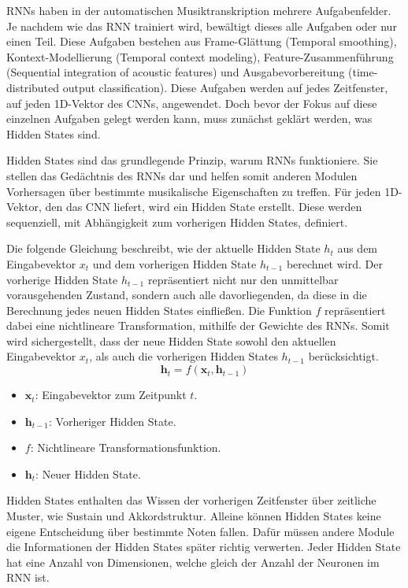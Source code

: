 RNNs haben in der automatischen Musiktranskription mehrere Aufgabenfelder.
Je nachdem wie das RNN trainiert wird, bewältigt dieses alle Aufgaben oder nur einen Teil.
Diese Aufgaben bestehen aus Frame-Glättung (Temporal smoothing), Kontext-Modellierung (Temporal context modeling),
Feature-Zusammenführung (Sequential integration of acoustic features)
und Ausgabevorbereitung (time-distributed output classification).
Diese Aufgaben werden auf jedes Zeitfenster, auf jeden 1D-Vektor des CNNs, angewendet.
Doch bevor der Fokus auf diese einzelnen Aufgaben gelegt werden kann, muss zunächst geklärt werden, was Hidden States sind.

\begin{description}[style=nextline]
\item[Hidden States]\label{itm:hidden}
Hidden States sind das grundlegende Prinzip, warum RNNs funktioniere.
Sie stellen das Gedächtnis des RNNs dar und helfen somit
anderen Modulen Vorhersagen über bestimmte musikalische Eigenschaften zu treffen.
Für jeden 1D-Vektor, den das CNN liefert, wird ein Hidden State erstellt.
Diese werden sequenziell, mit Abhängigkeit zum vorherigen Hidden States, definiert.

Die folgende Gleichung beschreibt, wie der aktuelle Hidden State $h_t$ aus dem Eingabevektor $x_t$ und dem vorherigen Hidden State $h_{t-1}$ berechnet wird.
Der vorherige Hidden State $h_{t-1}$ repräsentiert nicht nur den unmittelbar vorausgehenden Zustand,
sondern auch alle davorliegenden, da diese in die Berechnung jedes neuen Hidden States einfließen.
Die Funktion $f$ repräsentiert dabei eine nichtlineare Transformation, mithilfe der Gewichte des RNNs.
Somit wird sichergestellt, dass der neue Hidden State sowohl den aktuellen Eingabevektor $x_t$, als auch die vorherigen Hidden States $h_{t-1}$ berücksichtigt.
\[
\mathbf{h}_t = f(\mathbf{x}_t, \mathbf{h}_{t-1})
\]
\begin{itemize}
\item $\mathbf{x}_t$: Eingabevektor zum Zeitpunkt $t$.
\item $\mathbf{h}_{t-1}$: Vorheriger Hidden State.
\item $f$: Nichtlineare Transformationsfunktion.
\item $\mathbf{h}_t$: Neuer Hidden State.
\end{itemize}

Hidden States enthalten das Wissen der vorherigen Zeitfenster über zeitliche Muster, wie Sustain und Akkordstruktur.
Alleine können Hidden States keine eigene Entscheidung über bestimmte Noten fallen.
Dafür müssen andere Module die Informationen der Hidden States später richtig verwerten.
Jeder Hidden State hat eine Anzahl von Dimensionen, welche gleich der Anzahl der Neuronen im RNN ist.
\end{description}

